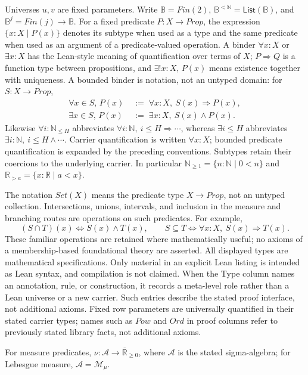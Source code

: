 \documentclass[11pt,reqno]{amsart}
\makeatletter
\newcommand{\N}{\mathbb N}
\newcommand{\R}{\mathbb R}
\newcommand{\Np}{\N_{\ge1}}
\theoremstyle{blueplain}
\newcounter{type}
\newcounter{asser}
\newcommand{\defref}[1]{\hyperref[#1]{Definition~\ref*{#1}}}
\numberwithin{equation}{section}
\DeclareRobustCommand{\defref}[1]{%
  \hyperlink{def:#1}{\ensuremath{\csname PredicateName@#1\endcsname}}}
\def\defref#1{#1}%
\def\hyperlink#1#2{#2}}
\makeatother
\begin{document}
Universes $u,v$ are fixed parameters. Write
$\mathbb B=\defref{Fin}(2)$, $\mathbb B^{<\N}=\textsf{List}(\mathbb B)$,
and $\mathbb B^j=\defref{Fin}(j)\to\mathbb B$.
For a fixed predicate $P:X\to\defref{Prop}$, the expression
$\{x:X\mid P(x)\}$ denotes its subtype when used as a type and the
same predicate when used as an argument of a predicate-valued operation. A binder $\forall x:X$ or
$\exists x:X$ has the Lean-style meaning of quantification over terms of $X$;
$P\Rightarrow Q$ is a function type between propositions, and
$\exists!x:X,\,P(x)$ means existence together with uniqueness.
A bounded binder is notation, not an untyped domain: for $S:X\to\defref{Prop}$,
\[
\begin{aligned}
\forall x\in S,\,P(x)&\;:=\;\forall x:X,\ S(x)\Rightarrow P(x),\\
\exists x\in S,\,P(x)&\;:=\;\exists x:X,\ S(x)\wedge P(x).
\end{aligned}
\]
Likewise $\forall i:\N_{\le H}$ abbreviates
$\forall i:\N,\ i\le H\Rightarrow\cdots$, whereas
$\exists i\le H$ abbreviates
$\exists i:\N,\ i\le H\wedge\cdots$.
Carrier quantification is written $\forall x:X$; bounded predicate
quantification is expanded by the preceding conventions. Subtypes retain their coercions to the
underlying carrier. In particular $\Np=\{n:\N\mid 0<n\}$ and
$\R_{>a}=\{x:\R\mid a<x\}$.

The notation $\defref{Set}(X)$ means the predicate type
$X\to\defref{Prop}$, not an untyped collection. Intersections, unions,
intervals, and inclusion in the measure and branching routes are operations
on such predicates. For example,
\[
(S\cap T)(x)\iff S(x)\wedge T(x),\qquad
S\subseteq T\iff\forall x:X,\ S(x)\Rightarrow T(x).
\]
These familiar operations are retained where mathematically useful; no
axioms of a membership-based foundational theory are asserted.
All displayed types are mathematical specifications. Only material in an
explicit Lean listing is intended as Lean syntax, and compilation is not
claimed. When the Type column names an annotation, rule, or construction,
it records a meta-level role rather than a Lean universe or a new carrier.
Such entries describe the stated proof interface, not additional axioms. Fixed row parameters are universally quantified in their stated
carrier types; names such as $\defref{Pow}$ and $\defref{Ord}$ in proof
columns refer to previously stated library facts, not additional axioms.

For measure predicates,
\(\nu:\mathcal A\to\overline{\R}_{\ge0}\),
where \(\mathcal A\) is the stated sigma-algebra;
for Lebesgue measure, \(\mathcal A=\mathcal M_\mu\).
\end{document}
